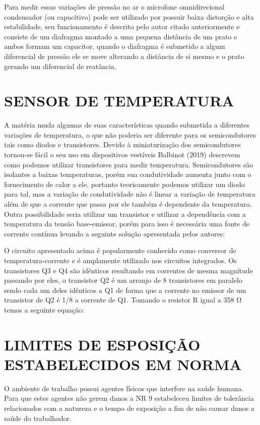 Para medir essas variações de pressão no ar o microfone omnidirecional condensador (ou capacitivo) pode ser utilizado por possuir baixa distorção e alta estabilidade, seu funcionamento é descrito pelo autor citado anteriormente e consiste de um diafragma montado a uma pequena distância de um prato e ambos formam um capacitor, quando o diafragma é submetido a algum diferencial de pressão ele se move alterando a distância de si mesmo e o prato gerando um diferencial de reatância.

\section{SENSOR DE TEMPERATURA}
\label{subsec: sensorDeTemperatura}

A matéria muda algumas de suas características quando submetida a diferentes variações de temperatura, o que não poderia ser diferente para os semicondutores tais como diodos e transistores. Devido à miniaturização dos semicondutores tornou-se fácil o seu uso em dispositivos vestíveis Balbinot (2019) descrevem como podemos utilizar transistores para medir temperatura. 
Semicondutores são isolantes a baixas temperaturas, porém sua condutividade aumenta junto com o fornecimento de calor a ele, portanto teoricamente podemos utilizar um diodo para tal, mas a variação de condutividade não é linear a variação de temperatura além de que a corrente que passa por ele também é dependente da temperatura. Outra possibilidade seria utilizar um transistor e utilizar a dependência com a temperatura da tensão base-emissor, porém para isso é necessária uma fonte de corrente contínua levando a seguinte solução apresentada pelos autores:

O circuito apresentado acima é popularmente conhecido como conversor de temperatura-corrente e é amplamente utilizado nos circuitos integrados. Os transistores Q3 e Q4 são idênticos resultando em correntes de mesma magnitude passando por eles, o transistor Q2 é um arranjo de 8 transistores em paralelo sendo cada um deles idênticos a Q1 de forma que a corrente no emissor de um transistor de Q2 é 1/8 a corrente de Q1. Tomando o resistor R igual a 358 Ω temos a seguinte equação:

\section{LIMITES DE ESPOSIÇÃO ESTABELECIDOS EM NORMA}
\label{subsec: sensorDeEsposicaoEstabelecidosEmNorma}

O ambiente de trabalho possui agentes físicos que interfere na saúde humana. Para que estes agentes não gerem danos a NR 9 estabeleceu limites de tolerância relacionados com a natureza e o tempo de exposição a fim de não causar danos a saúde do trabalhador.


